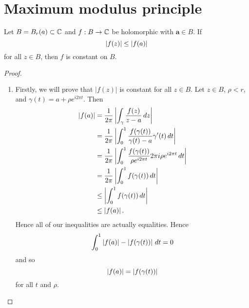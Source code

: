 \section{Maximum modulus principle}

\begin{theorem}
    Let $B = B_r(a) \subset \mathbb{C}$ and $f: B \to \mathbb{C}$ be holomorphic with $\bm a \in B$.
    If
    \[
        \left\lvert f(z)\right\rvert \leq \left\lvert f(a)\right\rvert
    \]
    for all $z \in B$, then $f$ is constant on $B$.
\end{theorem}

\begin{proof}
    \hfill
    \begin{enumerate}
        \item Firstly, we will prove that $\lvert f(z) \rvert$ is constant
            for all $z \in B$.
            Let $z \in B$, $\rho < r$, and $\gamma(t) = a + \rho e^{i2\pi t}$.
            Then
            \begin{align*}
                \left\lvert f(a)\right\rvert
                &= \frac{1}{2\pi} \left\lvert
                    \int_\gamma \frac{f(z)}{z - a} \,dz
                \right\rvert \\
                &= \frac{1}{2\pi} \left\lvert
                    \int_0^1
                    \frac{f(\gamma(t))}{\gamma(t) - a} \gamma'(t)
                    \,dt
                \right\rvert \\
                &= \frac{1}{2\pi} \left\lvert
                    \int_0^1
                    \frac{f(\gamma(t))}{\rho e^{i2\pi t}} 
                    2\pi i \rho e^{i2\pi t}
                    \,dt
                \right\rvert \\
                &= \frac{1}{2\pi} \left\lvert
                    \int_0^1 f(\gamma(t)) \,dt
                \right\rvert \\
                &\leq \left\lvert
                    \int_0^1 f(\gamma(t))\,dt
                \right\rvert \\
                &\leq \left\lvert f(a)\right\rvert.
            \end{align*}
            Hence all of our inequalities are actually equalities.
            Hence
            \[
                \int_0^1 \left\lvert f(a)\right\rvert - \left\lvert f(\gamma(t))\right\rvert \,dt = 0
            \]
            and so
            \[
                \left\lvert f(a)\right\rvert = \left\lvert f(\gamma(t))\right\rvert
            \]
            for all $t$ and $\rho$.


\end{enumerate}
\end{proof}
